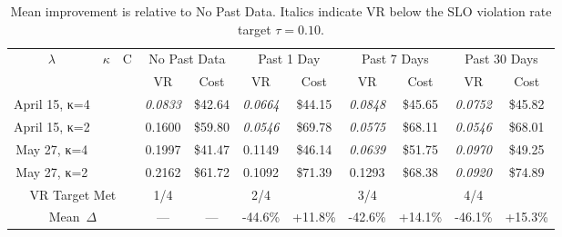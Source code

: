 \documentclass{article}
\begin{document}
\begin{table}[t]
\centering
\footnotesize
\setlength{\tabcolsep}{2.5pt}
\caption{Mean improvement is relative to No Past Data. Italics indicate VR below the SLO violation rate target $\tau=0.10$.}\label{tab:todo}
\begin{tabular}{c c c || c c | c c | c c | c c}
\toprule
$\lambda$ & $\kappa$ & C & \multicolumn{2}{c|}{No Past Data} & \multicolumn{2}{c|}{Past 1 Day} & \multicolumn{2}{c|}{Past 7 Days} & \multicolumn{2}{c}{Past 30 Days} \\
 &  &  & VR & Cost & VR & Cost & VR & Cost & VR & Cost \\
\hline
April 15, κ=4 &  &  & \textit{0.0833} & \$42.64 & \textit{0.0664} & \$44.15 & \textit{0.0848} & \$45.65 & \textit{0.0752} & \$45.82 \\
April 15, κ=2 &  &  & 0.1600 & \$59.80 & \textit{0.0546} & \$69.78 & \textit{0.0575} & \$68.11 & \textit{0.0546} & \$68.01 \\
May 27, κ=4 &  &  & 0.1997 & \$41.47 & 0.1149 & \$46.14 & \textit{0.0639} & \$51.75 & \textit{0.0970} & \$49.25 \\
May 27, κ=2 &  &  & 0.2162 & \$61.72 & 0.1092 & \$71.39 & 0.1293 & \$68.38 & \textit{0.0920} & \$74.89 \\
\hline
\multicolumn{3}{c||}{VR Target Met} & 1/4 &  & 2/4 &  & 3/4 &  & 4/4 &  \\
\multicolumn{3}{c||}{Mean~$\Delta$} & --- & --- & -44.6\% & +11.8\% & -42.6\% & +14.1\% & -46.1\% & +15.3\% \\
\bottomrule
\end{tabular}
\end{table}
\end{document}
